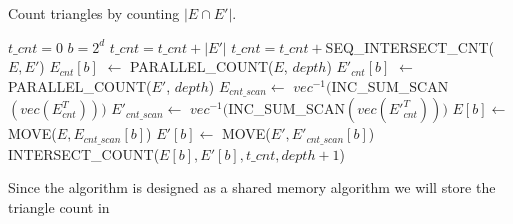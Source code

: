 \documentclass[conference]{IEEEtran}
\begin{document}
\begin{algorithm}
  \caption{Count triangles by counting $|E \cap E'|$.\label{tri_count}}
  \begin{algorithmic}[1]
    \Statex
    \State $t\_cnt = 0$ 
    \State $b=2^d$ 
	\State \Return{}
      \EndIf
	\State $t\_cnt = t\_cnt + |E'|$
	\State \Return{}
      \EndIf
	\State $t\_cnt = t\_cnt +$SEQ\_INTERSECT\_CNT($E, E'$)
	\State \Return{}
      \EndIf
      \State $E_{cnt}[b]$ $\gets$ PARALLEL\_COUNT($E$, $depth$)
      \State $E'_{cnt}[b]$ $\gets$ PARALLEL\_COUNT($E'$, $depth$)
      \State $E_{cnt\_scan} \gets$ $vec^{-1}($INC\_SUM\_SCAN$(vec(E_{cnt}^T)))$
      \State $E'_{cnt\_scan} \gets$ $vec^{-1}($INC\_SUM\_SCAN$(vec(E'_{cnt}^T)))$
	\State $E[b] \gets$ MOVE($E, E_{cnt\_scan}[b]$)
      \EndFor
	\State $E'[b] \gets$ MOVE($E', E'_{cnt\_scan}[b]$)
      \EndFor
	\State INTERSECT\_COUNT($E[b], E'[b], t\_cnt, depth+1$)
      \EndFor
    \EndFunction
  \end{algorithmic}
\end{algorithm}

Since the algorithm is designed as a shared memory algorithm we will store the triangle count in 


\end{document}
